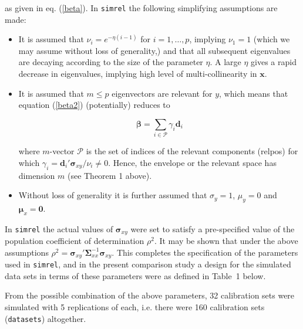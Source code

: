 \documentclass[num-refs]{wiley-article}
\begin{document}
as given in eq. (\ref{beta}). In {\tt simrel} the following simplifying assumptions are made:

\begin{itemize}[label=$\triangleright$]
\item It is assumed that $\nu_{i} = e^{-\eta(i-1)}$ for $i=1, \ldots, p$, implying $\nu_1=1$ (which we may assume without loss of generality,) and that all subsequent eigenvalues are decaying according to the size of the parameter $\eta$.  A large $\eta$ gives a rapid decrease in eigenvalues, implying high level of multi-collinearity in $\boldsymbol{x}$.
\item It is assumed that $m \le p$ eigenvectors are relevant for $y$, which means that equation (\ref{beta2}) (potentially) reduces to

  \begin{equation}
    \label{eq:relevant-beta}
    \bm{\beta} = \sum_{i \in \mathcal{P}}{\gamma_i \bm{d}_i}
  \end{equation}

  where $m$-vector $\mathcal{P}$ is the set of indices of the relevant components (relpos) for which $\gamma_i = \bm{d}_i' \bm{\sigma}_{xy}/\nu_i \ne 0$. Hence, the envelope or the relevant space has dimension $m$ (see Theorem 1 above).
\item Without loss of generality it is further assumed that $\sigma_y=1$, $\mu_y =0$ and $\boldsymbol{\mu}_{x}=\boldsymbol{0}$.
\end{itemize}

In {\tt simrel} the actual values of $\boldsymbol{\sigma}_{xy}$ were set to satisfy a pre-specified value of the population coefficient of determination $\rho^2$. It may be shown that under the above assumptions $\rho^2=\boldsymbol{\sigma}_{xy}'\boldsymbol{\Sigma}_{xx}^{-1}\boldsymbol{\sigma}_{xy}$. This completes the specification of the parameters used in {\tt simrel}, and in the present comparison study a design for the simulated data sets in terms of these parameters were as defined in Table~1 below.

From the possible combination of the above parameters, 32 calibration sets were simulated with 5 replications of each, i.e. there were 160 calibration sets ({\tt datasets}) altogether.

\bigskip

\end{document}
